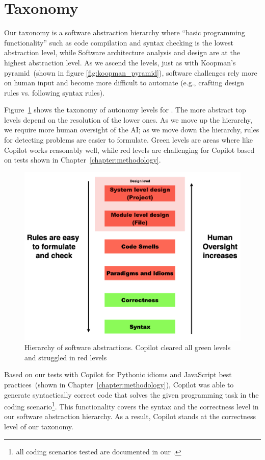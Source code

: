 \section{Taxonomy}
\label{taxonomy}
Our taxonomy is a software abstraction hierarchy where ``basic programming functionality'' such as code compilation and syntax checking is the lowest abstraction level, while
Software architecture analysis and design are at the highest abstraction level.
As we ascend the levels, just as with Koopman's pyramid~(shown in figure \ref{fig:koopman_pyramid}), 
software challenges rely more on human input and become more difficult to automate (e.g., crafting design rules vs. following syntax rules).

Figure~\ref{fig:taxonomy} shows the taxonomy of autonomy levels for \cct{}. The more abstract top levels depend on the resolution of the lower ones. As we move up the hierarchy, we require more human oversight of the AI; as we move down the hierarchy, rules for detecting problems are easier to formulate. Green levels are areas where \cct{} like Copilot works reasonably well, while red levels are challenging for Copilot based on tests shown in Chapter~\ref{chapter:methodology}.

\begin{figure}[hbt!]
    \centering
    \includegraphics[width=\linewidth]{Figures/taxonomy.png}
    \caption{Hierarchy of software abstractions. Copilot cleared all green levels and struggled in red levels}
    \label{fig:taxonomy}
\end{figure}

Based on our tests with Copilot for Pythonic idioms and JavaScript best practices~(shown in Chapter~\ref{chapter:methodology}), Copilot was able to generate syntactically correct code that solves the given programming task in the coding scenario\footnote{all coding scenarios tested are documented in our \repl{}.}.
This functionality covers the syntax and the correctness level in our software abstraction hierarchy.
As a result, Copilot stands at the correctness level of our taxonomy. 

